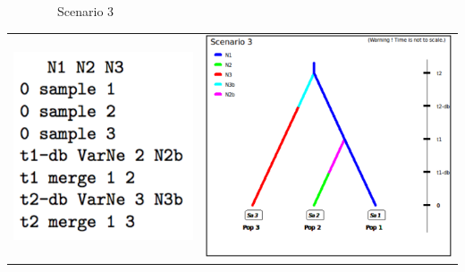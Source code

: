 \medskip{}
\ \ \ \ \ \ \ \ Scenario 3

\begin{center}
\begin{tabular}{cc}
\includegraphics[scale=0.5]{code_scenario_05-3}  & \includegraphics[scale=0.4]{test3pop_scenario_3} \tabularnewline
\end{tabular}
\par\end{center}

